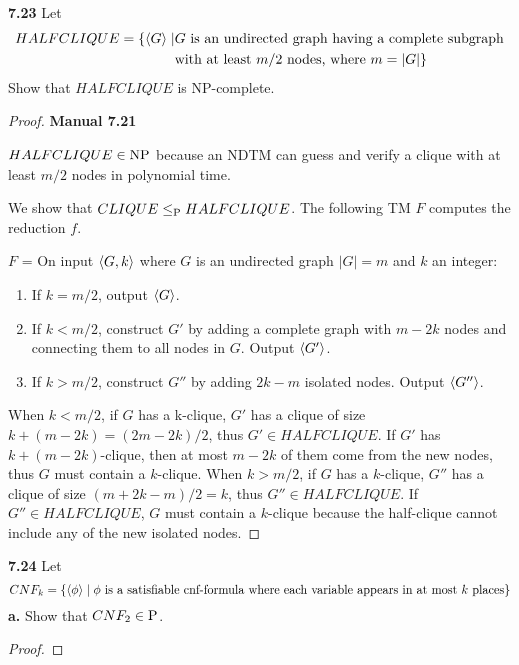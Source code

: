 \label{lang:HALFCLIQUE_NP}
\label{lang:HALFCLIQUE_NPC}
\textbf{7.23} Let 
\begin{align*}
HALFCLIQUE = \{ \desc{G} \mid & \text{$G$ is an undirected graph having a complete subgraph} \\
& \text{with at least $m/2$ nodes, where $m = |G|$}
\}
\end{align*}
Show that $HALFCLIQUE$ is NP-complete.
\begin{mdframed}
\begin{proof}
\textbf{Manual 7.21}

$HALFCLIQUE \in \NP$ because an NDTM can guess and verify a clique with at least $m/2$ nodes in polynomial time. 

\medskip
We show that $CLIQUE \leq_\P HALFCLIQUE$. The following TM $F$ computes the reduction $f$.

\medskip
$F$ = On input $\desc{G, k}$ where $G$ is an undirected graph $|G| = m$ and $k$ an integer:
\begin{enumerate}
\item If $k = m / 2$, output $\desc{G}$.
\item If $k < m / 2$, construct $G'$ by adding a complete graph with $m-2k$ nodes and connecting them to all nodes in $G$. Output $\desc{G'}$.
\item If $k > m / 2$, construct $G''$ by adding $2k - m$ isolated nodes. Output $\desc{G''}$.
\end{enumerate}

When $k < m / 2$, if $G$ has a k-clique, $G'$ has a clique of size $k + (m - 2k) = (2m - 2k )/2$, thus $G' \in HALFCLIQUE$. If $G'$ has $k+(m-2k)$-clique, then at most $m-2k$ of them come from the new nodes, thus $G$ must contain a $k$-clique. When $k> m/ 2$, if $G$ has a $k$-clique, $G''$ has a clique of size $(m + 2k - m) / 2 = k$, thus $G'' \in HALFCLIQUE$. If $G'' \in HALFCLIQUE$, $G$ must contain a $k$-clique because the half-clique cannot include any of the new isolated nodes.
\end{proof}
\end{mdframed}


\textbf{7.24} Let
\[
CNF_k = \{\desc{\phi} \mid \phi \text{ is a satisfiable cnf-formula where each variable appears in at most $k$ places} \}
\]
\textbf{a.} Show that $CNF_2 \in \P$.
\begin{mdframed}
\begin{proof}

\end{proof}
\end{mdframed}

